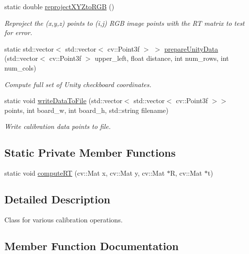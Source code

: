 \begin{DoxyCompactItemize}
static double \hyperlink{class_calibration_a05a3ca33bf7fb56ddf0c683be667660a}{reproject\+X\+Y\+Zto\+R\+GB} ()
\begin{DoxyCompactList}\small\item\em Reproject the (x,y,z) points to (i,j) R\+GB image points with the RT matrix to test for error. \end{DoxyCompactList}\item 
static std\+::vector$<$ std\+::vector$<$ cv\+::\+Point3f $>$ $>$ \hyperlink{class_calibration_af202af5f65e2f7242d29f09760f668d9}{prepare\+Unity\+Data} (std\+::vector$<$ cv\+::\+Point3f $>$ upper\+\_\+left, float distance, int num\+\_\+rows, int num\+\_\+cols)
\begin{DoxyCompactList}\small\item\em Compute full set of Unity checkboard coordinates. \end{DoxyCompactList}\item 
static void \hyperlink{class_calibration_acd3adc799a4a9ce12ce1547e989e20a4}{write\+Data\+To\+File} (std\+::vector$<$ std\+::vector$<$ cv\+::\+Point3f $>$$>$ points, int board\+\_\+w, int board\+\_\+h, std\+::string filename)
\begin{DoxyCompactList}\small\item\em Write calibration data points to file. \end{DoxyCompactList}\end{DoxyCompactItemize}
\subsection*{Static Private Member Functions}
\begin{DoxyCompactItemize}
\item 
static void \hyperlink{class_calibration_af69876a9c99d1ba8b87054796cf6be3e}{compute\+RT} (cv\+::\+Mat x, cv\+::\+Mat y, cv\+::\+Mat $\ast$R, cv\+::\+Mat $\ast$t)
\end{DoxyCompactItemize}


\subsection{Detailed Description}
Class for various calibration operations. 

\subsection{Member Function Documentation}
\hypertarget{class_calibration_af69876a9c99d1ba8b87054796cf6be3e}{}\label{class_calibration_af69876a9c99d1ba8b87054796cf6be3e} 
